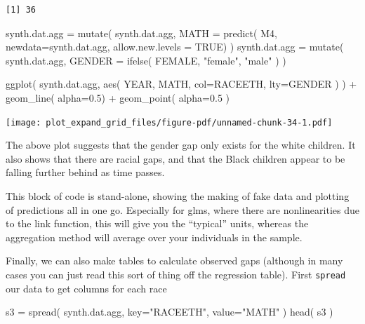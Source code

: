\documentclass[
  letterpaper,
  DIV=11,
  numbers=noendperiod]{scrreprt}
\newenvironment{Shaded}{}{}
\newcommand{\AttributeTok}[1]{\textcolor[rgb]{0.49,0.56,0.16}{#1}}
\newcommand{\ConstantTok}[1]{\textcolor[rgb]{0.53,0.00,0.00}{#1}}
\newcommand{\FloatTok}[1]{\textcolor[rgb]{0.25,0.63,0.44}{#1}}
\newcommand{\FunctionTok}[1]{\textcolor[rgb]{0.02,0.16,0.49}{#1}}
\newcommand{\NormalTok}[1]{#1}
\newcommand{\OtherTok}[1]{\textcolor[rgb]{0.00,0.44,0.13}{#1}}
\newcommand{\SpecialCharTok}[1]{\textcolor[rgb]{0.25,0.44,0.63}{#1}}
\newcommand{\StringTok}[1]{\textcolor[rgb]{0.25,0.44,0.63}{#1}}
\begin{document}
\begin{verbatim}
[1] 36
\end{verbatim}

\begin{Shaded}
\begin{Highlighting}[]
\NormalTok{synth.dat.agg }\OtherTok{=} \FunctionTok{mutate}\NormalTok{( synth.dat.agg, }
                        \AttributeTok{MATH =} \FunctionTok{predict}\NormalTok{( M4, }
                                        \AttributeTok{newdata=}\NormalTok{synth.dat.agg,}
                                        \AttributeTok{allow.new.levels =} \ConstantTok{TRUE}\NormalTok{) )}
\NormalTok{synth.dat.agg }\OtherTok{=} \FunctionTok{mutate}\NormalTok{( synth.dat.agg, }\AttributeTok{GENDER =} \FunctionTok{ifelse}\NormalTok{( FEMALE, }\StringTok{"female"}\NormalTok{, }\StringTok{"male"}\NormalTok{ ) )}

\FunctionTok{ggplot}\NormalTok{( synth.dat.agg, }\FunctionTok{aes}\NormalTok{( YEAR, MATH, }\AttributeTok{col=}\NormalTok{RACEETH, }\AttributeTok{lty=}\NormalTok{GENDER ) ) }\SpecialCharTok{+}
  \FunctionTok{geom\_line}\NormalTok{( }\AttributeTok{alpha=}\FloatTok{0.5}\NormalTok{) }\SpecialCharTok{+} \FunctionTok{geom\_point}\NormalTok{( }\AttributeTok{alpha=}\FloatTok{0.5}\NormalTok{ )}
\end{Highlighting}
\end{Shaded}

\texttt{[image: plot\_expand\_grid\_files/figure-pdf/unnamed-chunk-34-1.pdf]}

The above plot suggests that the gender gap only exists for the white
children. It also shows that there are racial gaps, and that the Black
children appear to be falling further behind as time passes.

This block of code is stand-alone, showing the making of fake data and
plotting of predictions all in one go. Especially for glms, where there
are nonlinearities due to the link function, this will give you the
``typical'' units, whereas the aggregation method will average over your
individuals in the sample.

Finally, we can also make tables to calculate observed gaps (although in
many cases you can just read this sort of thing off the regression
table). First \texttt{spread} our data to get columns for each race

\begin{Shaded}
\begin{Highlighting}[]
\NormalTok{s3 }\OtherTok{=} \FunctionTok{spread}\NormalTok{( synth.dat.agg, }\AttributeTok{key=}\StringTok{"RACEETH"}\NormalTok{, }\AttributeTok{value=}\StringTok{"MATH"}\NormalTok{ )}
\FunctionTok{head}\NormalTok{( s3 )}
\end{Highlighting}
\end{Shaded}
\end{document}
